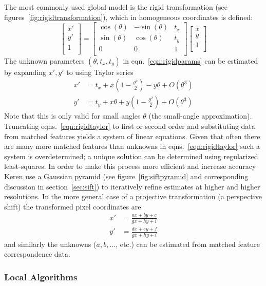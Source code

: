 The most commonly used global model is the rigid transformation (see figures~\ref{fig:rigidtransformation}), which in homogeneous coordinates is defined:
\begin{equation}
		\begin{bmatrix}
			x' \\
			y' \\
			1             \\
		\end{bmatrix} = 						\begin{bmatrix}
												   \cos(\theta) & -\sin(\theta) & t_x \\
												   \sin(\theta) & \cos(\theta)  & t_y \\
												   0            & 0             & 1   \\
		\end{bmatrix}			\begin{bmatrix}
									 x \\
									 y \\
									 1 \\
		\end{bmatrix}
	\label{eqn:rigidparams}
\end{equation}
The unknown parameters \((\theta, t_x, t_y)\) in eqn.~\eqref{eqn:rigidparams} can be estimated by expanding \(x', y'\) to using Taylor series
\begin{equation}
    \begin{split}
		x' &= t_x +  x\left( 1 - \frac{\theta^2}{2} \right) - y\theta  + O(\theta^3) \\
		y' &= t_y + x \theta  + y\left( 1 - \frac{\theta^2}{2} \right) + O(\theta^3)
    \end{split}
	\label{eqn:rigidtaylor}
\end{equation}
Note that this is only valid for small angles \(\theta\) (the small-angle approximation\cite{keren1988}).
%
Truncating eqns.~\eqref{eqn:rigidtaylor} to first or second order and substituting data from matched features yields a system of linear equations.
%
Given that often there are many more matched features than unknowns in eqns.~\eqref{eqn:rigidtaylor} such a system is overdetermined; a unique solution can be determined using regularized least-squares.
%
In order to make this process more efficient and increase accuracy Keren \etal\cite{keren1988} use a Gaussian pyramid (see figure~\ref{fig:siftpyramid} and corresponding discussion in section~\ref{sec:sift}) to iteratively refine estimates at higher and higher resolutions.
%
In the more general case of a projective transformation (a perspective shift) the transformed pixel coordinates are
\begin{equation}
	\begin{split}
	x' & = \frac{ax+by+c}{gx+hy+i} \\
	y' & = \frac{dx+ey+f}{gx+hy+i}
	\label{eqn:projectivetf}
	\end{split}
\end{equation}
and similarly the unknowns (\(a,b,\dots\), etc.) can be estimated from matched feature correspondence data.

\subsubsection{Local Algorithms}

